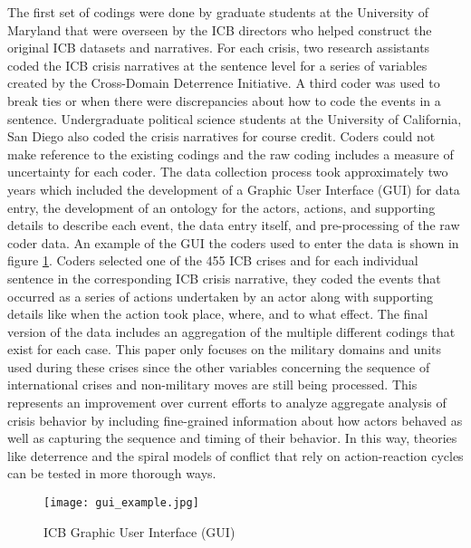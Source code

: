\documentclass[12pt,letterpaper]{article}
\begin{document}
		The first set of codings were done by graduate students at the University of Maryland that were overseen by the ICB directors who helped construct the original ICB datasets and narratives. For each crisis, two research assistants coded the ICB crisis narratives at the sentence level for a series of variables created by the Cross-Domain Deterrence Initiative. A third coder was used to break ties or when there were discrepancies about how to code the events in a sentence. Undergraduate political science students at the University of California, San Diego also coded the crisis narratives for course credit. Coders could not make reference to the existing codings and the raw coding includes a measure of uncertainty for each coder. The data collection process took approximately two years which included the development of a Graphic User Interface (GUI) for data entry, the development of an ontology for the actors, actions, and supporting details to describe each event, the data entry itself, and pre-processing of the raw coder data. An example of the GUI the coders used to enter the data is shown in figure \ref{fig:coding_gui}. Coders selected one of the 455 ICB crises and for each individual sentence in the corresponding ICB crisis narrative, they coded the events that occurred as a series of actions undertaken by an actor along with supporting details like when the action took place, where, and to what effect. The final version of the data includes an aggregation of the multiple different codings that exist for each case. This paper only focuses on the military domains and units used during these crises since the other variables concerning the sequence of international crises and non-military moves are still being processed. This represents an improvement over current efforts to analyze aggregate analysis of crisis behavior by including fine-grained information about how actors behaved as well as capturing the sequence and timing of their behavior. In this way, theories like deterrence and the spiral models of conflict that rely on action-reaction cycles can be tested in more thorough ways.
		
		\begin{figure}[h]
			\centering
			\texttt{[image: gui\_example.jpg]}
			\caption{ICB Graphic User Interface (GUI)}
			\label{fig:coding_gui}
		\end{figure} 
		
\end{document}
